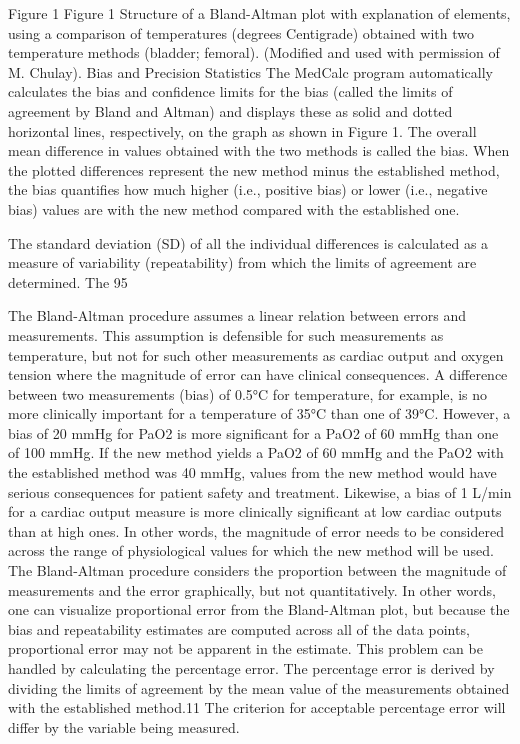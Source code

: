 \documentclass[]{article}
\begin{document}
Figure 1
Figure 1
Structure of a Bland-Altman plot with explanation of elements, using a comparison of temperatures (degrees Centigrade) obtained with two temperature methods (bladder; femoral). (Modified and used with permission of M. Chulay).
Bias and Precision Statistics
The MedCalc program automatically calculates the bias and confidence limits for the bias (called the limits of agreement by Bland and Altman) and displays these as solid and dotted horizontal lines, respectively, on the graph as shown in Figure 1. The overall mean difference in values obtained with the two methods is called the bias. When the plotted differences represent the new method minus the established method, the bias quantifies how much higher (i.e., positive bias) or lower (i.e., negative bias) values are with the new method compared with the established one.

The standard deviation (SD) of all the individual differences is calculated as a measure of variability (repeatability) from which the limits of agreement are determined. The 95%

The Bland-Altman procedure assumes a linear relation between errors and measurements. This assumption is defensible for such measurements as temperature, but not for such other measurements as cardiac output and oxygen tension where the magnitude of error can have clinical consequences. A difference between two measurements (bias) of 0.5°C for temperature, for example, is no more clinically important for a temperature of 35°C than one of 39°C. However, a bias of 20 mmHg for PaO2 is more significant for a PaO2 of 60 mmHg than one of 100 mmHg. If the new method yields a PaO2 of 60 mmHg and the PaO2 with the established method was 40 mmHg, values from the new method would have serious consequences for patient safety and treatment. Likewise, a bias of 1 L/min for a cardiac output measure is more clinically significant at low cardiac outputs than at high ones. In other words, the magnitude of error needs to be considered across the range of physiological values for which the new method will be used. The Bland-Altman procedure considers the proportion between the magnitude of measurements and the error graphically, but not quantitatively. In other words, one can visualize proportional error from the Bland-Altman plot, but because the bias and repeatability estimates are computed across all of the data points, proportional error may not be apparent in the estimate. This problem can be handled by calculating the percentage error. The percentage error is derived by dividing the limits of agreement by the mean value of the measurements obtained with the established method.11 The criterion for acceptable percentage error will differ by the variable being measured.
\end{document}
